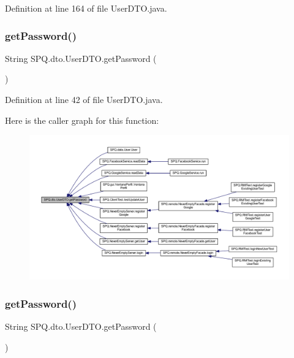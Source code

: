 Definition at line 164 of file User\+D\+T\+O.\+java.

\mbox{\label{class_s_p_q_1_1dto_1_1_user_d_t_o_a955f436e60336683283a6fcd6fc5f874}} 
\subsubsection{\texorpdfstring{get\+Password()}{getPassword()}\hspace{0.1cm}{\footnotesize\ttfamily [1/3]}}
{\footnotesize\ttfamily String S\+P\+Q.\+dto.\+User\+D\+T\+O.\+get\+Password (\begin{DoxyParamCaption}{ }\end{DoxyParamCaption})}



Definition at line 42 of file User\+D\+T\+O.\+java.

Here is the caller graph for this function\+:\nopagebreak
\begin{figure}[H]
\begin{center}
\leavevmode
\includegraphics[width=350pt]{class_s_p_q_1_1dto_1_1_user_d_t_o_a955f436e60336683283a6fcd6fc5f874_icgraph}
\end{center}
\end{figure}
\mbox{\label{class_s_p_q_1_1dto_1_1_user_d_t_o_a955f436e60336683283a6fcd6fc5f874}} 
\subsubsection{\texorpdfstring{get\+Password()}{getPassword()}\hspace{0.1cm}{\footnotesize\ttfamily [2/3]}}
{\footnotesize\ttfamily String S\+P\+Q.\+dto.\+User\+D\+T\+O.\+get\+Password (\begin{DoxyParamCaption}{ }\end{DoxyParamCaption})}



